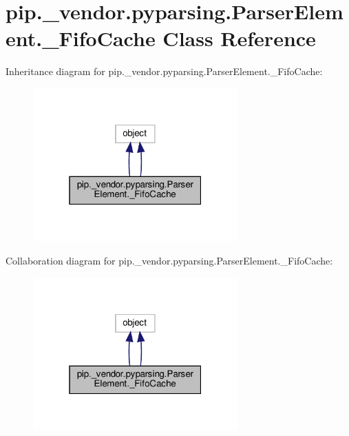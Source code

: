 \hypertarget{classpip_1_1__vendor_1_1pyparsing_1_1ParserElement_1_1__FifoCache}{}\section{pip.\+\_\+vendor.\+pyparsing.\+Parser\+Element.\+\_\+\+Fifo\+Cache Class Reference}
\label{classpip_1_1__vendor_1_1pyparsing_1_1ParserElement_1_1__FifoCache}


Inheritance diagram for pip.\+\_\+vendor.\+pyparsing.\+Parser\+Element.\+\_\+\+Fifo\+Cache\+:
\nopagebreak
\begin{figure}[H]
\begin{center}
\leavevmode
\includegraphics[width=223pt]{classpip_1_1__vendor_1_1pyparsing_1_1ParserElement_1_1__FifoCache__inherit__graph}
\end{center}
\end{figure}


Collaboration diagram for pip.\+\_\+vendor.\+pyparsing.\+Parser\+Element.\+\_\+\+Fifo\+Cache\+:
\nopagebreak
\begin{figure}[H]
\begin{center}
\leavevmode
\includegraphics[width=223pt]{classpip_1_1__vendor_1_1pyparsing_1_1ParserElement_1_1__FifoCache__coll__graph}
\end{center}
\end{figure}
